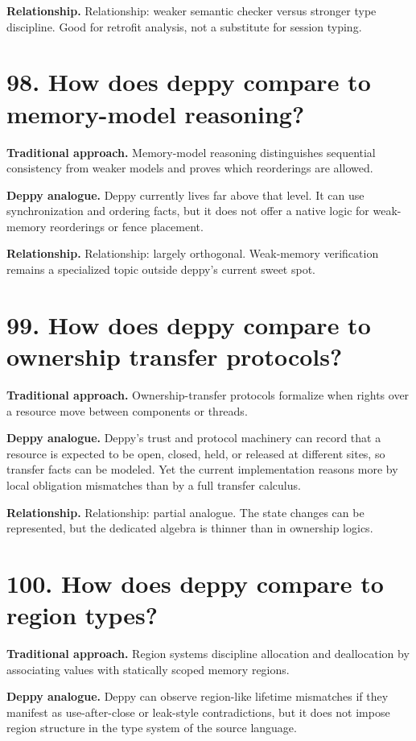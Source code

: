 \documentclass[11pt,openany]{book}
\begin{document}
\textbf{Relationship.} Relationship: weaker semantic checker versus stronger type discipline. Good for retrofit analysis, not a substitute for session typing.

\section*{98. How does deppy compare to memory-model reasoning?}
\textbf{Traditional approach.} Memory-model reasoning distinguishes sequential consistency from weaker models and proves which reorderings are allowed.

\textbf{Deppy analogue.} Deppy currently lives far above that level. It can use synchronization and ordering facts, but it does not offer a native logic for weak-memory reorderings or fence placement.

\textbf{Relationship.} Relationship: largely orthogonal. Weak-memory verification remains a specialized topic outside deppy's current sweet spot.

\section*{99. How does deppy compare to ownership transfer protocols?}
\textbf{Traditional approach.} Ownership-transfer protocols formalize when rights over a resource move between components or threads.

\textbf{Deppy analogue.} Deppy's trust and protocol machinery can record that a resource is expected to be open, closed, held, or released at different sites, so transfer facts can be modeled. Yet the current implementation reasons more by local obligation mismatches than by a full transfer calculus.

\textbf{Relationship.} Relationship: partial analogue. The state changes can be represented, but the dedicated algebra is thinner than in ownership logics.

\section*{100. How does deppy compare to region types?}
\textbf{Traditional approach.} Region systems discipline allocation and deallocation by associating values with statically scoped memory regions.

\textbf{Deppy analogue.} Deppy can observe region-like lifetime mismatches if they manifest as use-after-close or leak-style contradictions, but it does not impose region structure in the type system of the source language.
\end{document}
